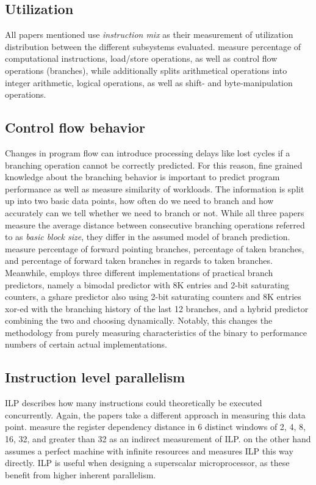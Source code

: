 \documentclass[../bachelor_paper.tex]{subfiles}
\begin{document}
\subsection{Utilization}
All papers mentioned use \emph{instruction mix} as their measurement of utilization distribution between the different subsystems evaluated. \cite{phansalkarMeasuringProgramSimilarity2005,joshiMeasuringBenchmarkSimilarity2006} measure percentage of computational instructions, load/store operations, as well as control flow operations (branches), while \cite{eeckhoutQuantifyingImpactInput} additionally splits arithmetical operations into integer arithmetic, logical operations, as well as shift- and byte-manipulation operations.

\subsection{Control flow behavior}
Changes in program flow can introduce processing delays like lost cycles if a branching operation cannot be correctly predicted. For this reason, fine grained knowledge about the branching behavior is important to predict program performance as well as measure similarity of workloads. The information is split up into two basic data points, how often do we need to branch and how accurately can we tell whether we need to branch or not. While all three papers measure the average distance between consecutive branching operations referred to as \emph{basic block size}, they differ in the assumed model of branch prediction. \cite{phansalkarMeasuringProgramSimilarity2005,joshiMeasuringBenchmarkSimilarity2006} measure percentage of forward pointing branches, percentage of taken branches, and percentage of forward taken branches in regards to taken branches. Meanwhile, \cite{eeckhoutQuantifyingImpactInput} employs three different implementations of practical branch predictors, namely a bimodal predictor with 8K entries and 2-bit saturating counters, a gshare predictor also using 2-bit saturating counters and 8K entries xor-ed with the branching history of the last 12 branches, and a hybrid predictor combining the two and choosing dynamically. Notably, this changes the methodology from purely measuring characteristics of the binary to performance numbers of certain actual implementations.

\subsection{Instruction level parallelism}
\Acf{ILP} describes how many instructions could theoretically be executed concurrently. Again, the papers take a different approach in measuring this data point. \cite{phansalkarMeasuringProgramSimilarity2005,joshiMeasuringBenchmarkSimilarity2006} measure the register dependency distance in 6 distinct windows of 2, 4, 8, 16, 32, and greater than 32 as an indirect measurement of \ac{ILP}. \cite{eeckhoutQuantifyingImpactInput} on the other hand assumes a perfect machine with infinite resources and measures \ac{ILP} this way directly. \Ac{ILP} is useful when designing a superscalar microprocessor, as these benefit from higher inherent parallelism.
\end{document}
